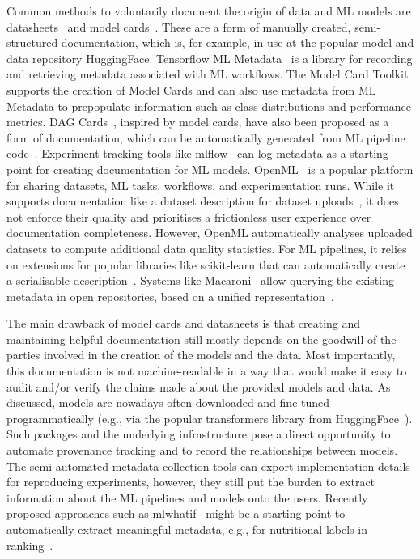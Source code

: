  Common methods to voluntarily document the origin of data and ML models are datasheets~\cite{gebru2021datasheets} and model cards~\cite{mitchell2019model}. These are a form of manually created, semi-structured documentation, which is, for example, in use at the popular model and data repository HuggingFace.
%
Tensorflow ML Metadata~\cite{Katsiapis2020tfx} is a library for recording and retrieving metadata associated with ML workflows. The Model Card Toolkit~\cite{fang2020introducing} supports the creation of Model Cards and can also use metadata from ML Metadata to prepopulate information such as class distributions and performance metrics. DAG Cards~\cite{tagliabue2021dag}, inspired by model cards, have also been proposed as a form of documentation, which can be automatically generated from ML pipeline code~\cite{berg2019open}. Experiment tracking tools like mlflow~\cite{zaharia2018accelerating} can log metadata as a starting point for creating documentation for ML models. OpenML~\cite{rijn2013openml} is a popular platform for sharing datasets, ML tasks, workflows, and experimentation runs. While it supports documentation like a dataset description for dataset uploads~\cite{OpenMLDatasetUpload}, it does not enforce their quality and prioritises a frictionless user experience over documentation completeness. However, OpenML automatically analyses uploaded datasets to compute additional data quality statistics. For ML pipelines, it relies on extensions for popular libraries like scikit-learn that can automatically create a serialisable description~\cite{OpenMLDocs}. Systems like Macaroni~\cite{li2023macaroni} allow querying the existing metadata in open repositories, based on a unified representation~\cite{li2023metadata}.

 The main drawback of model cards and datasheets is that creating and maintaining helpful documentation still mostly depends on the goodwill of the parties involved in the creation of the models and the data. Most importantly, this documentation is not machine-readable in a way that would make it easy to audit and/or verify the claims made about the provided models and data. As discussed, models are nowadays often downloaded and fine-tuned programmatically (e.g., via the popular transformers library from HuggingFace~\cite{huggingtransformers}). Such packages and the underlying infrastructure pose a direct opportunity to automate provenance tracking and to record the relationships between models. The semi-automated metadata collection tools can export implementation details for reproducing experiments, however, they still put the burden to extract information about the ML pipelines and models onto the users. Recently proposed approaches such as mlwhatif~\cite{grafberger2023mlwhatif} might be a starting point to automatically extract meaningful metadata, e.g., for nutritional labels in ranking~\cite{yang2018nutritional,stoyanovich2019nutritional}.


